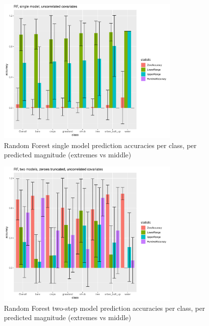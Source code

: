 \documentclass[a4paper,10pt]{article}
\begin{document}
\begin{figure}
    \includegraphics[width=0.8\textwidth]{article-figures/barplots/2019-03-19-rf-1m-uncor-bar}
    \caption{Random Forest single model prediction accuracies per class, per predicted magnitude (extremes vs middle)}
    \label{bar-rf-1m-uncor}
\end{figure}
\begin{figure}
    \includegraphics[width=0.8\textwidth]{article-figures/barplots/2019-03-19-rf-2m-uncor-bar}
    \caption{Random Forest two-step model prediction accuracies per class, per predicted magnitude (extremes vs middle)}
    \label{bar-rf-2m-uncor}
\end{figure}
\end{document}
